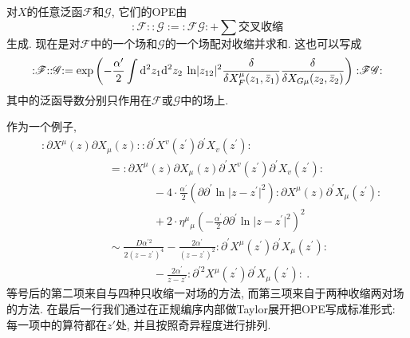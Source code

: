 对$X$的任意泛函$\mathscr{F}$和$\mathscr{G}$, 它们的OPE由
\begin{equation}
: \mathrel{\mathscr{F}}: :\mathrel{\mathscr{G}}:=: \mathrel{\mathscr{F} \mathscr{G}}:+\sum \text{交叉收缩}
\end{equation}
生成. 现在是对$\mathscr{F}$中的一个场和$\mathscr{G}$的一个场配对收缩并求和. 这也可以写成
\begin{equation}
	: \mathrel{\mathscr{F}}: :\mathrel{\mathscr{G}}:= \exp \left(-\frac{\alpha^{\prime}}{2} 
	\int \mathrm{d}^{2} z_{1} \mathrm{d}^{2} z_{2}\: \ln \lvert z_{12}\rvert^{2} \frac{\delta}{\delta X_{F}^{\mu}(z_{1}, \bar{z}_{1})} 
	\frac{\delta}{\delta X_{G \mu}(z_{2}, \bar{z}_{2})}\right): \mathrel{\mathscr{F} \mathscr{G}}: \label{2.2.10}
\end{equation}
其中的泛函导数分别只作用在$\mathscr{F}$或$\mathscr{G}$中的场上.

作为一个例子,
\begin{align}
&: \mathrel{\partial X^{\mu}(z) \partial X_{\mu}(z)}: : \mathrel{\partial^{\prime} X^{v}(z^{\prime}) \partial^{\prime} X_{v}(z^{\prime})}: \nonumber \\
&\qquad \qquad \qquad =: \mathrel{\partial X^{\mu}(z) \partial X_{\mu}(z) \partial^{\prime} X^{v}(z^{\prime}) \partial^{\prime} X_{v}(z^{\prime})}: \nonumber\\
&\qquad \qquad \qquad \qquad \qquad {-}4 \cdot \frac{\alpha^{\prime}}{2}
(\partial \partial^{\prime} \ln \lvert z-z^{\prime}\rvert^{2}): \mathrel{\partial X^{\mu}(z) \partial^{\prime} X_{\mu}(z^{\prime})}: \nonumber\\
&\qquad \qquad \qquad \qquad \qquad {+}2 \cdot \eta^{\mu}{ }_{\mu}\left(-\frac{\alpha^{\prime}}{2} \partial \partial^{\prime}
 \ln \lvert z-z^{\prime}\rvert^{2}\right)^{2} \nonumber\\
 &\qquad \qquad \qquad \sim \frac{D \alpha^{\prime 2}}{2(z-z^{\prime})^{4}}-\frac{2 \alpha^{\prime}}{(z-z^{\prime})^{2}}
 : \mathrel{\partial^{\prime} X^{\mu}(z^{\prime}) \partial^{\prime} X_{\mu}(z^{\prime})}: \nonumber\\
&\qquad \qquad \qquad \qquad \qquad {-}\frac{2 \alpha^{\prime}}{z-z^{\prime}}: \mathrel{\partial^{\prime 2} X^{\mu}\left(z^{\prime}\right) \partial^{\prime} X_{\mu}\left(z^{\prime}\right)}:\:.  \label{2.2.11}
\end{align}
等号后的第二项来自与四种只收缩一对场的方法, 而第三项来自于两种收缩两对场的方法. 在最后一行我们通过在正规编序内部做Taylor展开把OPE写成标准形式: 每一项中的算符都在$z'$处, 并且按照奇异程度进行排列.

